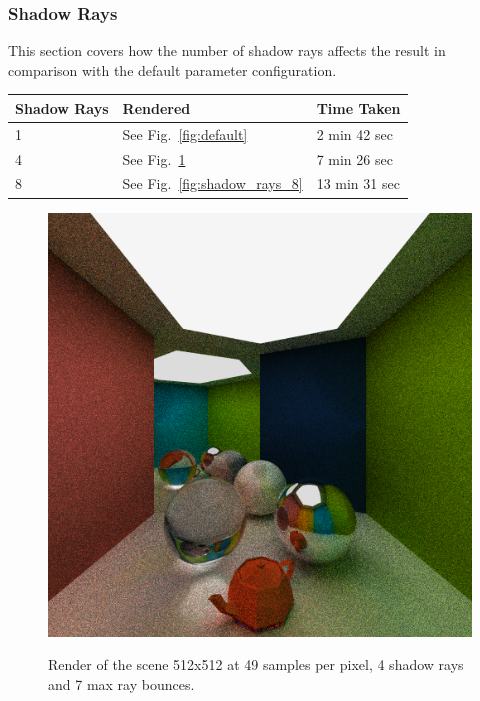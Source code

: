 \documentclass[a4paper, twocolumn]{article}
\begin{document}
            \subsubsection*{Shadow Rays}

            This section covers how the number of shadow rays affects the result in comparison with the default parameter configuration.

            \begin{table}[H]
            \centering
            \begin{tabular}{lll}
                \toprule
                \textbf{Shadow Rays}&\textbf{Rendered}&\textbf{Time Taken}\\
                \midrule
                1&See Fig.~\ref{fig:default}&2 min 42 sec\\
                4&See Fig.~\ref{fig:shadow_rays_4}&7 min 26 sec\\
                8&See Fig.~\ref{fig:shadow_rays_8}&13 min 31 sec\\
                \bottomrule
            \end{tabular}
            \label{tab:shadow_rays}
            \end{table}

            \begin{figure}[H]
                \centering
                \caption{Render of the scene 512x512 at 49 samples per pixel, 4 shadow rays and 7 max ray bounces.}
                \includegraphics[width=0.8\linewidth]{share/results/shadow_rays_4.png}
                \label{fig:shadow_rays_4}
            \end{figure}
\end{document}

